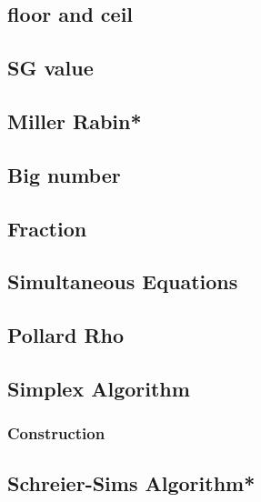 \subsection{floor and ceil}

\subsection{SG value}

% 
\subsection{Miller Rabin*} %

\subsection{Big number}

\subsection{Fraction}

\subsection{Simultaneous Equations}

\subsection{Pollard Rho}

\subsection{Simplex Algorithm}

\subsubsection{Construction}

\subsection{Schreier-Sims Algorithm*} %

